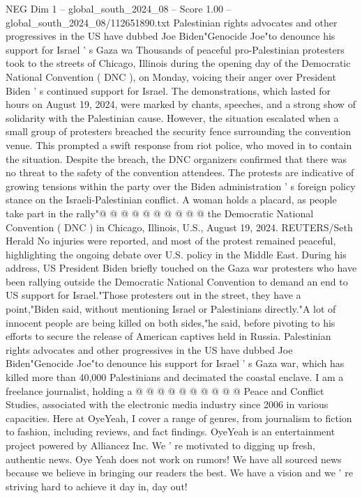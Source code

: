 \begin{textsample}{NEG Dim 1 – global\_south\_2024\_08 – Score 1.00 – global\_south\_2024\_08/112651890.txt}  \label{ex:f1_neg_123}
Palestinian rights advocates and other progressives in the US have dubbed Joe Biden"Genocide Joe"to denounce his support for Israel ' s Gaza wa Thousands of peaceful pro-Palestinian protesters took to the streets of Chicago, Illinois during the opening day of the Democratic National Convention ( DNC ), on Monday, voicing their anger over President Biden ' s continued support for Israel.
The demonstrations, which lasted for hours on August 19, 2024, were marked by chants, speeches, and a strong show of solidarity with the Palestinian cause.
However, the situation escalated when a small group of protesters breached the security fence surrounding the convention venue.
This prompted a swift response from riot police, who moved in to contain the situation.
Despite the breach, the DNC organizers confirmed that there was no threat to the safety of the convention attendees.
The protests are indicative of growing tensions within the party over the Biden administration ' s foreign policy stance on the Israeli-Palestinian conflict.
A woman holds a placard, as people take part in the rally"@ @ @ @ @ @ @ @ @ @ the Democratic National Convention ( DNC ) in Chicago, Illinois, U.S., August 19, 2024.
REUTERS/Seth Herald No injuries were reported, and most of the protest remained peaceful, highlighting the ongoing debate over U.S. policy in the Middle East.
During his address, US President Biden briefly touched on the Gaza war protesters who have been rallying outside the Democratic National Convention to demand an end to US support for Israel."Those protesters out in the street, they have a point,"Biden said, without mentioning Israel or Palestinians directly."A lot of innocent people are being killed on both sides,"he said, before pivoting to his efforts to secure the release of American captives held in Russia.
Palestinian rights advocates and other progressives in the US have dubbed Joe Biden"Genocide Joe"to denounce his support for Israel ' s Gaza war, which has killed more than 40,000 Palestinians and decimated the coastal enclave.
I am a freelance journalist, holding a @ @ @ @ @ @ @ @ @ @ Peace and Conflict Studies, associated with the electronic media industry since 2006 in various capacities.
Here at OyeYeah, I cover a range of genres, from journalism to fiction to fashion, including reviews, and fact findings.
OyeYeah is an entertainment project powered by Alliancez Inc.
We ' re motivated to digging up fresh, authentic news.
Oye Yeah does not work on rumors!
We have all sourced news because we believe in bringing our readers the best.
We have a vision and we ' re striving hard to achieve it day in, day out!

\end{textsample}
